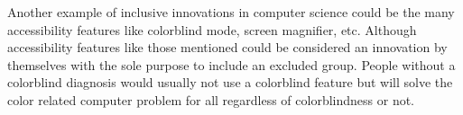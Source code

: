 Another example of inclusive innovations in computer science could be the many accessibility features like colorblind mode, screen magnifier, etc. 
Although accessibility features like those mentioned could be considered an innovation by themselves with the sole purpose to include an excluded group.
People without a colorblind diagnosis would usually not use a colorblind feature but will solve the color related computer problem for all regardless of colorblindness or not.